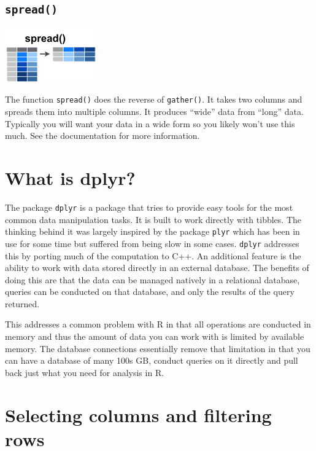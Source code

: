 \documentclass[]{book}
\begin{document}
\hypertarget{spread}{%
\subsection*{\texorpdfstring{\texttt{spread()}}{spread()}}\label{spread}}

\includegraphics{./figures/tidyr-spread.png}

The function \texttt{spread()} does the reverse of \texttt{gather()}. It takes two columns and spreads them into multiple columns. It produces ``wide'' data from ``long'' data. Typically you will want your data in a wide form so you likely won't use this much. See the documentation for more information.

\hypertarget{what-is-dplyr}{%
\section{What is dplyr?}\label{what-is-dplyr}}

The package \texttt{dplyr} is a package that tries to provide easy tools for the most common data manipulation tasks. It is built to work directly with tibbles. The thinking behind it was largely inspired by the package \texttt{plyr} which has been in use for some time but suffered from being slow in some cases. \texttt{dplyr} addresses this by porting much of the computation to C++. An additional feature is the ability to work with data stored directly in an external database. The benefits of doing this are that the data can be managed natively in a relational database, queries can be conducted on that database, and only the results of the query returned.

This addresses a common problem with R in that all operations are conducted in memory and thus the amount of data you can work with is limited by available memory. The database connections essentially remove that limitation in that you can have a database of many 100s GB, conduct queries on it directly and pull back just what you need for analysis in R.

\hypertarget{selecting-columns-and-filtering-rows}{%
\section{Selecting columns and filtering rows}\label{selecting-columns-and-filtering-rows}}
\end{document}
